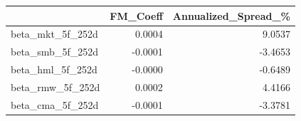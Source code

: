 \begin{tabular}{lrr}
\toprule
 & FM\_Coeff & Annualized\_Spread\_\% \\
\midrule
beta\_mkt\_5f\_252d & 0.0004 & 9.0537 \\
beta\_smb\_5f\_252d & -0.0001 & -3.4653 \\
beta\_hml\_5f\_252d & -0.0000 & -0.6489 \\
beta\_rmw\_5f\_252d & 0.0002 & 4.4166 \\
beta\_cma\_5f\_252d & -0.0001 & -3.3781 \\
\bottomrule
\end{tabular}
